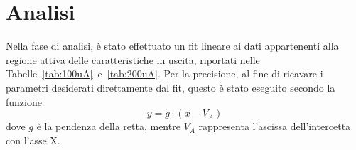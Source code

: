 \documentclass[../main.tex]{subfiles}
\begin{document}
    \section{Analisi}\label{sec:analisi}
%    
        Nella fase di analisi, è stato effettuato un fit lineare ai dati
        appartenenti alla regione attiva delle caratteristiche in
        uscita, riportati nelle
        Tabelle~\ref{tab:100uA}~e~\ref{tab:200uA}.
        Per la precisione, al fine di ricavare i parametri
        desiderati direttamente dal fit, questo è stato eseguito
        secondo la funzione
        \begin{equation*}
            y = g \cdot ( x - V_A)
        \end{equation*}
        dove $g$ è la pendenza della retta, mentre $V_A$ rappresenta
        l'ascissa dell'intercetta con l'asse X.
\end{document}
